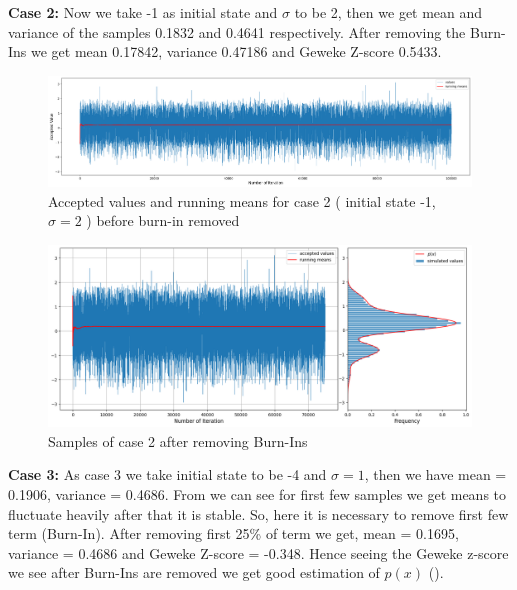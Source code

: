 \begin{example}
    \textbf{Case 2:}  Now we take -1 as initial state and $ \sigma $ to be 2, then we get mean and variance of the samples 0.1832 and 0.4641 respectively. After removing the Burn-Ins we get mean 0.17842, variance 0.47186 and Geweke Z-score 0.5433.

    \begin{figure}[H]
        \centering
        \includegraphics[width=1\textwidth]{./images/metropolis/example1/sample-2-values.png}
        \caption{Accepted values and running means for case 2 ( initial state -1, $ \sigma = 2 $ ) before burn-in removed}
    \end{figure}

    \begin{figure}[H]
        \centering
        \includegraphics[width=1\textwidth]{./images/metropolis/example1/sample-2-value-hist-bo.png}
        \caption{Samples of case 2 after removing Burn-Ins}
    \end{figure}

    \textbf{Case 3:} As case 3 we take initial state to be -4 and $ \sigma = 1$, then we have mean = 0.1906, variance = 0.4686. From  we can see for first few samples we get means to fluctuate heavily after that it is stable. So, here it is necessary to remove first few term (Burn-In). After removing first 25\% of term we get, mean = 0.1695, variance = 0.4686 and Geweke Z-score = -0.348. Hence seeing the Geweke z-score we see after Burn-Ins are removed we get good estimation of $ p(x) $ ().


\end{example}
